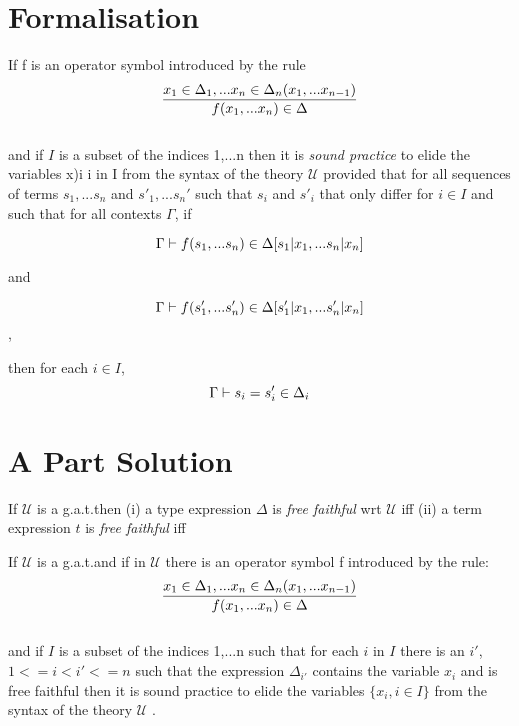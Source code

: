 \documentclass[10pt,a4paper,fleqn]{article}
\newcommand{\gat}[1][U]{
\ensuremath{\mathcal{#1}} }
\newcommand{\isagat}[1][U]{\gat[#1] is a g.a.t.}
\begin{document}
\section{Formalisation}
\begin{definition}
If f is an operator symbol introduced by the rule  \\
$$\frac{x_1 \in \Delta_1,... x_{n} \in \Delta_{n}(x_1,...x_{n-1})}{f(x_1,...x_n) \in \Delta}$$ \\

and if $I$ is a subset of the indices {1,...n} then it is \textit{sound practice} to elide the variables x)i i in I from the syntax of the theory \gat provided that 
 for all sequences of terms $s_1,...s_n$ and
$s'_1,...s_n'$ such that $s_i$ and $s'_i$ that only differ for $i \in I$ and such that for all  contexts $\Gamma$, if 

$$\Gamma  \vdash f(s_1,...s_n) \in \Delta[s_1|x_1,...s_n|x_n]$$

and 

$$\Gamma  \vdash f(s'_1,...s'_n) \in \Delta[s'_1|x_1,...s'_n|x_n]$$,

then for each $i \in I$,
$$\Gamma  \vdash s_i = s'_i \in \Delta_i$$
\end{definition}



\section{A Part Solution}

\begin{definition}
If \isagat then 
(i)  a type expression $\Delta$ is \textit{free faithful} wrt \gat iff 
(ii) a term expression $t$ is \textit{free faithful}  iff 
\end{definition}

\begin{lemma}
If \isagat and if in \gat there is an operator symbol f introduced by the rule:\\

$$\frac{x_1 \in \Delta_1,... x_{n} \in \Delta_{n}(x_1,...x_{n-1})}{f(x_1,...x_n) \in \Delta}$$ \\

and if $I$ is a subset of the indices {1,...n} such that for each $i$ in $I$ there is an
$i'$, $1<=i<i'<=n$ such that the expression $\Delta_{i'}$ contains the variable 
$x_i$ and  is free faithful then it is sound practice to elide the variables $\{x_i, i \in I \}$ from the
syntax of the theory \gat.
\end{lemma}
\end{document}

